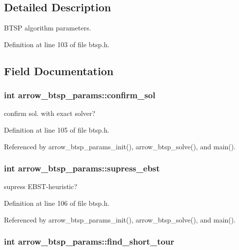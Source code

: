 \subsection{Detailed Description}
BTSP algorithm parameters. 

Definition at line 103 of file btsp.h.

\subsection{Field Documentation}
\hypertarget{structarrow__btsp__params_2c579feb3ff41f4d73b5de97596fe465}{
\subsubsection{\setlength{\rightskip}{0pt plus 5cm}int {\bf arrow\_\-btsp\_\-params::confirm\_\-sol}}}
\label{structarrow__btsp__params_2c579feb3ff41f4d73b5de97596fe465}


confirm sol. with exact solver? 

Definition at line 105 of file btsp.h.

Referenced by arrow\_\-btsp\_\-params\_\-init(), arrow\_\-btsp\_\-solve(), and main().\hypertarget{structarrow__btsp__params_cd85b850ac7c8495a4689100e8c3182c}{
\subsubsection{\setlength{\rightskip}{0pt plus 5cm}int {\bf arrow\_\-btsp\_\-params::supress\_\-ebst}}}
\label{structarrow__btsp__params_cd85b850ac7c8495a4689100e8c3182c}


supress EBST-heuristic? 

Definition at line 106 of file btsp.h.

Referenced by arrow\_\-btsp\_\-params\_\-init(), arrow\_\-btsp\_\-solve(), and main().\hypertarget{structarrow__btsp__params_f5fd677200b64930838c6905cbada990}{
\subsubsection{\setlength{\rightskip}{0pt plus 5cm}int {\bf arrow\_\-btsp\_\-params::find\_\-short\_\-tour}}}
\label{structarrow__btsp__params_f5fd677200b64930838c6905cbada990}


